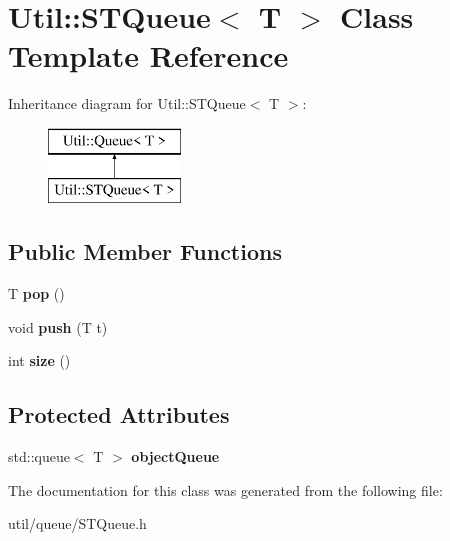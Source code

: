 \hypertarget{class_util_1_1_s_t_queue}{}\section{Util\+:\+:S\+T\+Queue$<$ T $>$ Class Template Reference}
\label{class_util_1_1_s_t_queue}
Inheritance diagram for Util\+:\+:S\+T\+Queue$<$ T $>$\+:\begin{figure}[H]
\begin{center}
\leavevmode
\includegraphics[height=2.000000cm]{class_util_1_1_s_t_queue}
\end{center}
\end{figure}
\subsection*{Public Member Functions}
\begin{DoxyCompactItemize}
\item 
\mbox{\label{class_util_1_1_s_t_queue_a1e2f3196fbecf7944e019fb3deebb5a8}} 
T {\bfseries pop} ()
\item 
\mbox{\label{class_util_1_1_s_t_queue_a2cfc960d40efe8717d7ddca226e09425}} 
void {\bfseries push} (T t)
\item 
\mbox{\label{class_util_1_1_s_t_queue_a2061e1db96e377c3721fe387c90f592c}} 
int {\bfseries size} ()
\end{DoxyCompactItemize}
\subsection*{Protected Attributes}
\begin{DoxyCompactItemize}
\item 
\mbox{\label{class_util_1_1_s_t_queue_a4dbd208b7093e61e55aeeebd724681b8}} 
std\+::queue$<$ T $>$ {\bfseries object\+Queue}
\end{DoxyCompactItemize}


The documentation for this class was generated from the following file\+:\begin{DoxyCompactItemize}
\item 
util/queue/S\+T\+Queue.\+h\end{DoxyCompactItemize}
